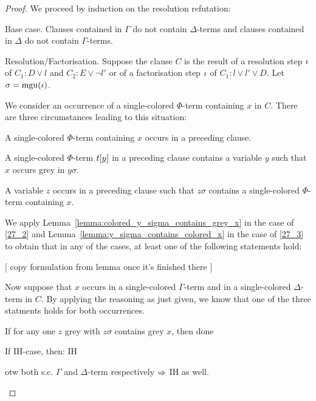 \documentclass[,%
	draft=false,%
	numbers=noendperiod
	11pt,
	a4paper,
	oneside,%
	openany,
]{memoir}
\begin{document}
\begin{proof}
	We proceed by induction on the resolution refutation:

	\begin{description}
		\item{}Base case.
			Clauses contained in $\Gamma$ do not contain $\Delta$-terms and clauses contained in $\Delta$ do not contain $\Gamma$-terms.

		\item{}Resolution/Factorisation.
			Suppose the clause $C$ is the result of a resolution step $\iota$ of $C_1: D \lor l$ and $C_2: E \lor \lnot l'$
			or of a factorisation step $\iota$ of $C_1: l \lor l' \lor D$.
			Let $\sigma = \operatorname{mgu}(\iota)$. 


			We consider an occurrence of a single-colored $\Phi$-term containing $x$ in $C$.
			There are three circumstances leading to this situation:
			\begin{compactenum}
				\item A single-colored $\Phi$-term containing $x$ occurs in a preceding clause.
				\item A single-colored $\Phi$-term $t[y]$ in a preceding clause contains a variable $y$ such that $x$ occurs grey in $y\sigma$. \label{27_2}
				\item A variable $z$ occurs in a preceding clause such that $z\sigma$ contains a single-colored $\Phi$-term containing $x$. \label{27_3}
			\end{compactenum}

			We apply Lemma~\ref{lemma:colored_y_sigma_contains_grey_x} in the case of \ref{27_2} and
			Lemma~\ref{lemma:y_sigma_contains_colored_x} in the case of \ref{27_3} to obtain that in any of the cases, at least one of the following statements hold:

			[ copy formulation from lemma once it's finished there ]

			Now suppose that $x$ occurs in a single-colored $\Gamma$-term and in a single-colored $\Delta$-term in $C$.
			By applying the reasoning as just given, we know that one of the three statments holds for both occurrences. 

			If for any one $z$ grey with $z\sigma$ contains grey $x$, then done

			If IH-case, then: IH

			otw both s.c. $\Gamma$ and $\Delta$-term respectively $\Rightarrow$ IH as well.
			\qedhere




	\end{description}

\end{proof}
\end{document}
